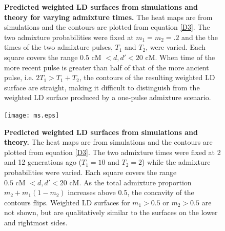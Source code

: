 \begin{figure}
{{\bf Predicted weighted LD surfaces from simulations and theory for varying admixture times.} The heat maps are from simulations and the contours are plotted from equation \ref{D3}. The two admixture probabilities were fixed at $m_1=m_2=.2$ and the the times of the two admixture pulses, $T_1$ and $T_2$, were varied. Each square covers the range $0.5 \text{ cM }<d,d'<20\text{ cM}$. When time of the more recent pulse is greater than half of that of the more ancient pulse, i.e. $2T_1>T_1+T_2$, the contours of the resulting weighted LD surface are straight, making it difficult to distinguish from the weighted LD surface produced by a one-pulse admixture scenario.
}
\label{Ts}
\end{figure}

\begin{figure}
\texttt{[image: ms.eps]}
\caption{
{\bf Predicted weighted LD surfaces from simulations and theory.} The heat maps are from simulations and the contours are plotted from equation \ref{D3}. The two admixture times were fixed at 2 and 12 generations ago ($T_1=10$ and $T_2=2$) while the admixture probabilities were varied. Each square covers the range $0.5 \text{ cM }<d,d'<20\text{ cM}$. As the total admixture proportion $m_2+m_1(1-m_2)$ increases above 0.5, the concavity of the contours flips. Weighted LD surfaces for $m_1>0.5$ or $m_2>0.5$ are not shown, but are qualitatively similar to the surfaces on the lower and rightmost sides.  
}
\label{ms}
\end{figure}

